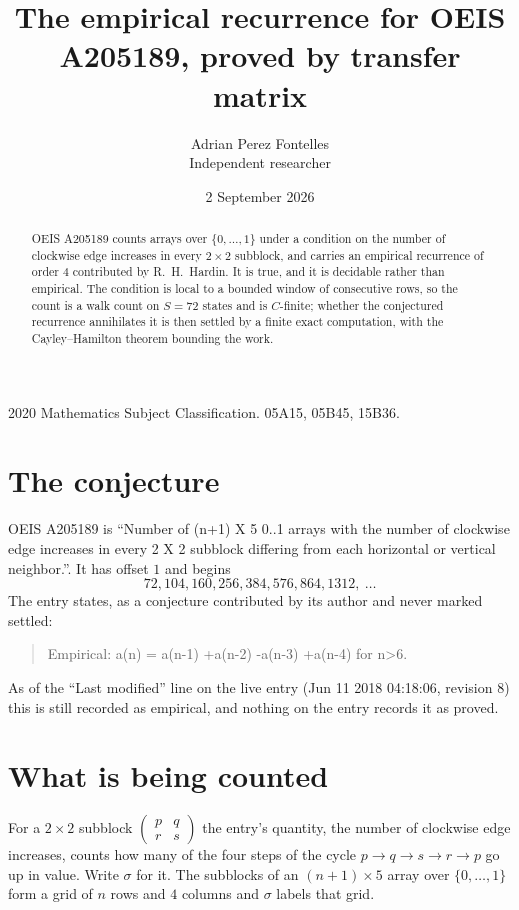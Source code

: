 \documentclass[11pt,a4paper]{article}
\title{The empirical recurrence for OEIS A205189, proved by transfer matrix}
\author{Adrian Perez Fontelles\\ \small Independent researcher}
\date{2 September 2026}
\theoremstyle{plain}
\theoremstyle{definition}
\begin{document}
\maketitle

\begin{abstract}
OEIS A205189 counts arrays over $\{0,\dots,1\}$ under a condition on the number of clockwise edge increases
in every $2\times2$ subblock, and carries an empirical recurrence of order $4$ contributed by
R.~H.~Hardin. It is true, and it is decidable rather than empirical. The condition is local to
a bounded window of consecutive rows, so the count is a walk count on $S=72$ states and is
$C$-finite; whether the conjectured recurrence annihilates it is then settled by a finite exact
computation, with the Cayley--Hamilton theorem bounding the work.
\end{abstract}

\noindent\small 2020 Mathematics Subject Classification. 05A15, 05B45, 15B36.\normalsize

\section{The conjecture}

OEIS A205189 is ``Number of (n+1) X 5 0..1 arrays with the number of clockwise edge increases in every 2 X 2 subblock differing from each horizontal or vertical neighbor.''. It has offset $1$ and begins
\[
72, 104, 160, 256, 384, 576, 864, 1312,\ \dots
\]
The entry states, as a conjecture contributed by its author and never marked settled:
\begin{quote}
Empirical: a(n) = a(n-1) +a(n-2) -a(n-3) +a(n-4) for n>6.
\end{quote}
As of the ``Last modified'' line on the live entry (Jun 11 2018 04:18:06, revision 8) this is still
recorded as empirical, and nothing on the entry records it as proved.

\section{What is being counted}

For a $2\times2$ subblock $\begin{pmatrix}p&q\\r&s\end{pmatrix}$ the
entry's quantity, the number of clockwise edge increases, counts how many of the four steps of the cycle $p\to q\to s\to r\to p$ go up in value. Write $\sigma$ for it. The subblocks of an
$(n+1)\times5$ array over $\{0,\dots,1\}$ form a grid of $n$ rows and $4$
columns and $\sigma$ labels that grid.
\end{document}
